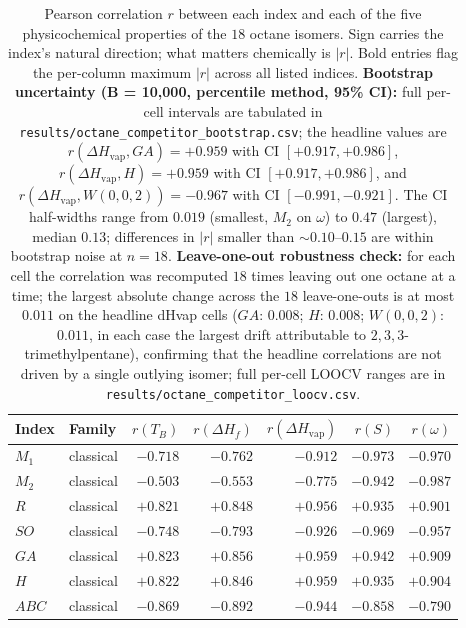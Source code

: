 \documentclass[11pt,a4paper]{article}
\theoremstyle{definition}
\begin{document}
\begin{table}[h]
\centering
\caption{Pearson correlation $r$ between each index and each of the five physicochemical properties of the $18$ octane isomers. Sign carries the index's natural direction; what matters chemically is $|r|$. Bold entries flag the per-column maximum $|r|$ across all listed indices. \textbf{Bootstrap uncertainty (B = 10,000, percentile method, 95\% CI):} full per-cell intervals are tabulated in \texttt{results/octane\_competitor\_bootstrap.csv}; the headline values are $r(\Delta H_\mathrm{vap}, GA) = +0.959$ with CI $[+0.917, +0.986]$, $r(\Delta H_\mathrm{vap}, H) = +0.959$ with CI $[+0.917, +0.986]$, and $r(\Delta H_\mathrm{vap}, W(0,0,2)) = -0.967$ with CI $[-0.991, -0.921]$. The CI half-widths range from $0.019$ (smallest, $M_2$ on $\omega$) to $0.47$ (largest), median $0.13$; differences in $|r|$ smaller than ${\sim}0.10$--$0.15$ are within bootstrap noise at $n = 18$. \textbf{Leave-one-out robustness check:} for each cell the correlation was recomputed $18$ times leaving out one octane at a time; the largest absolute change across the $18$ leave-one-outs is at most $0.011$ on the headline dHvap cells ($GA$: $0.008$; $H$: $0.008$; $W(0, 0, 2)$: $0.011$, in each case the largest drift attributable to $2,3,3$-trimethylpentane), confirming that the headline correlations are not driven by a single outlying isomer; full per-cell LOOCV ranges are in \texttt{results/octane\_competitor\_loocv.csv}.}
\label{tab:octane_competitor}
\small
\begin{tabular}{llrrrrr}
\toprule
Index & Family & $r(T_B)$ & $r(\Delta H_f)$ & $r(\Delta H_\mathrm{vap})$ & $r(S)$ & $r(\omega)$\\
\midrule
$M_1$              & classical & $-0.718$ & $-0.762$ & $-0.912$ & $-0.973$ & $-0.970$\\
$M_2$              & classical & $-0.503$ & $-0.553$ & $-0.775$ & $-0.942$ & $-0.987$\\
$R$                & classical & $+0.821$ & $+0.848$ & $+0.956$ & $+0.935$ & $+0.901$\\
$SO$               & classical & $-0.748$ & $-0.793$ & $-0.926$ & $-0.969$ & $-0.957$\\
$GA$               & classical & $+0.823$ & $+0.856$ & $+0.959$ & $+0.942$ & $+0.909$\\
$H$                & classical & $+0.822$ & $+0.846$ & $+0.959$ & $+0.935$ & $+0.904$\\
$ABC$              & classical & $-0.869$ & $-0.892$ & $-0.944$ & $-0.858$ & $-0.790$\\

\end{tabular}
\end{table}
\end{document}
